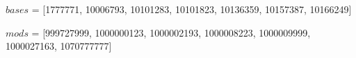 $bases$ = [1777771, 10006793, 10101283, 10101823, 10136359, 10157387, 10166249]

$mods$ = [999727999, 1000000123, 1000002193, 1000008223, 1000009999, 1000027163, 1070777777] \\